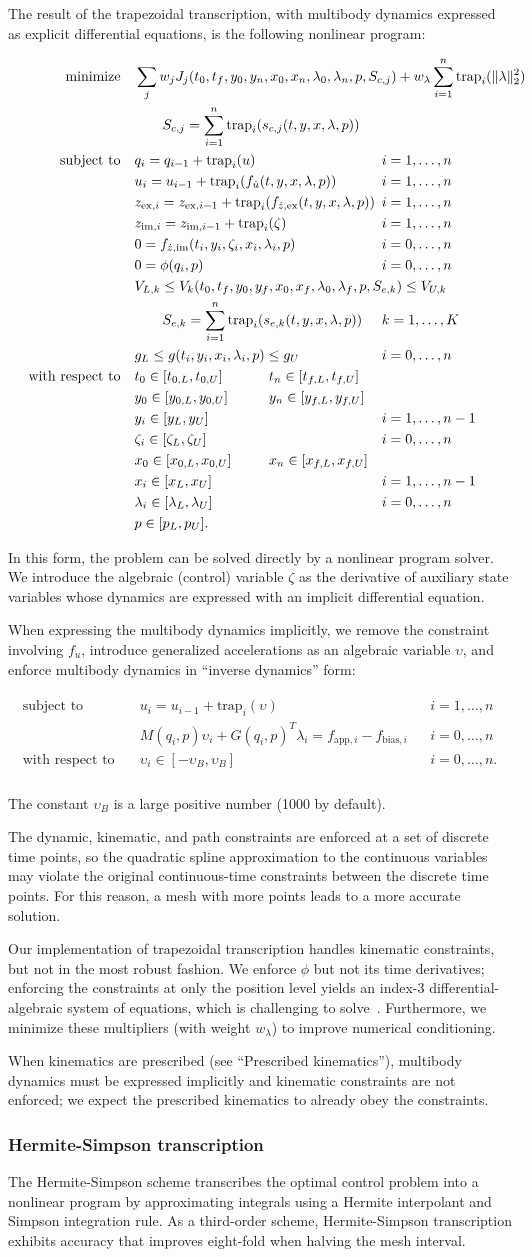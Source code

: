 \documentclass[10pt,letterpaper]{article}
\newcommand{\trapnlp}{
\begin{align}
    \begin{aligned}
        \mbox{minimize} \quad
         & \sum_j w_j J_{j}(t_0, t_f, \mathrlap{y_0, y_n, x_{0}, x_{n}, \lambda_0, \lambda_n, p, S_{c,j})
          + w_{\lambda} \sum_{i=1}^{n} \textrm{trap}_i(\|\lambda\|_2^2)}  \\
         & \quad\quad \mathrlap{S_{c,j} = \sum_{i=1}^{n} \textrm{trap}_i(s_{c,j}(t, y, x, \lambda, p))} \\
        \mbox{subject to} \quad
         & \mathrlap{q_i = q_{i-1} + \textrm{trap}_i(u)} &&&& i = 1, \ldots, n \\
         & \mathrlap{u_i = u_{i-1} + \textrm{trap}_i(f_{\dot{u}}(t, y, x, \lambda, p))}  &&&& i = 1, \ldots, n \\
         & \mathrlap{z_{\textrm{ex},i} = z_{\textrm{ex},i-1} + \textrm{trap}_i(f_{\dot{z},\textrm{ex}}(t, y, x, \lambda, p))} &&&& i = 1, \ldots, n \\
         & \mathrlap{z_{\textrm{im},i} = z_{\textrm{im},i-1} + \textrm{trap}_i(\zeta)} &&&& i = 1, \ldots, n \\
         & \mathrlap{0 = f_{\dot{z},\textrm{im}}(t_i, y_i, \zeta_i, x_i, \lambda_i, p)} &&&& i = 0, \ldots, n \\
         & 0 = \phi(q_i, p)  &&&& i = 0, \ldots, n\\
         & V_{L,k} \leq V_k(t_0, t_f, y_0, \mathrlap{y_f, x_{0}, x_{f}, \lambda_0, \lambda_f, p, S_{e,k}) \leq V_{U,k}} \\
         & \quad\quad \mathrlap{S_{e,k} = \sum_{i=1}^{n} \textrm{trap}_i(s_{e,k}(t, y, x, \lambda, p))} &&&& k = 1, \ldots, K \\
         & \mathrlap{g_{L} \leq g(t_i, y_i, x_{i}, \lambda_i, p) \leq g_{U}}  &&&& i = 0, \ldots, n\\
         \mbox{with respect to} \quad
         & t_0 \in [t_{0,L}, t_{0,U}] && t_n \in [t_{f,L}, t_{f,U}] \\
         & y_0 \in [y_{0,L}, y_{0,U}] && y_n \in [y_{f,L}, y_{f,U}] \\
         & y_i \in [y_{L}, y_{U}] &&&& i = 1, \ldots, n - 1\\
         & \zeta_i \in [\zeta_{L}, \zeta_{U}] &&&& i = 0, \ldots, n \\
         & x_0 \in [x_{0,L}, x_{0,U}] && x_n \in [x_{f,L}, x_{f,U}] \\
         & x_i \in [x_{L}, x_{U}] &&&& i = 1, \ldots, n - 1\\
         & \lambda_i \in [\lambda_L, \lambda_U] &&&& i = 0, \ldots, n \\
         & p \in [p_{L}, p_{U}].
    \end{aligned}
\end{align}
}
\newcommand{\trapimplicit}{
\begin{align}
    \begin{aligned}
    \mbox{subject to} \quad
         & u_i = u_{i-1} + \textrm{trap}_i(\upsilon)  && i = 1, \ldots, n \\
         & M(q_i, p)\upsilon_i + G(q_i, p)^T \lambda_i =
          f_{\textrm{app},i} - f_{\textrm{bias},i} && i = 0, \ldots, n \\
    \mbox{with respect to} \quad
         & \upsilon_i \in [-\upsilon_{B}, \upsilon_{B}] && i = 0, \ldots, n.\\
    \end{aligned}
\end{align}
}
\begin{document}
The result of the trapezoidal transcription, with multibody dynamics expressed as explicit differential equations, is the following nonlinear program:

\trapnlp

In this form, the problem can be solved directly by a nonlinear program solver. We introduce the algebraic (control) variable $\zeta$ as the derivative of auxiliary state variables whose dynamics are expressed with an implicit differential equation.

When expressing the multibody dynamics implicitly, we remove the constraint involving $f_{\dot{u}}$, introduce generalized accelerations as an algebraic variable $\upsilon$, and enforce multibody dynamics in “inverse dynamics” form:

\trapimplicit

The constant $\upsilon_B$ is a large positive number (1000 by default).

The dynamic, kinematic, and path constraints are enforced at a set of discrete time points, so the quadratic spline approximation to the continuous variables may violate the original continuous-time constraints between the discrete time points. For this reason, a mesh with more points leads to a more accurate solution.

Our implementation of trapezoidal transcription handles kinematic constraints, but not in the most robust fashion. We enforce $\phi$ but not its time derivatives; enforcing the constraints at only the position level yields an index-3 differential-algebraic system of equations, which is challenging to solve~\cite{Hairer:1996,Campbell:2016,Betts:2010}. Furthermore, we minimize these multipliers (with weight $w_\lambda$) to improve numerical conditioning.

When kinematics are prescribed (see “Prescribed kinematics”), multibody dynamics must be expressed implicitly and kinematic constraints are not enforced; we expect the prescribed kinematics to already obey the constraints.

\subsubsection*{Hermite-Simpson transcription}

The Hermite-Simpson scheme transcribes the optimal control problem into a nonlinear program by approximating integrals using a Hermite interpolant and Simpson integration rule. As a third-order scheme, Hermite-Simpson transcription exhibits accuracy that improves eight-fold when halving the mesh interval.
\end{document}
